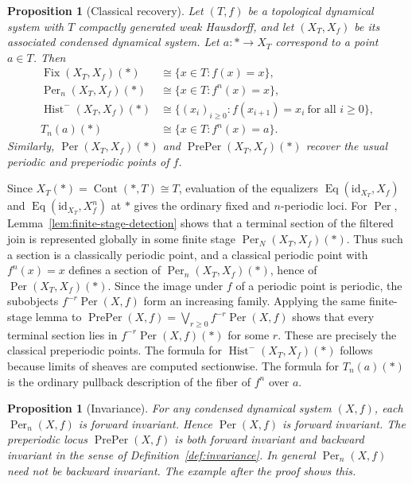 \documentclass[10pt]{amsart}
\makeatletter
\newcommand{\Eq}{\operatorname{Eq}}
\newcommand{\Cont}{\operatorname{Cont}}
\newcommand{\Fix}{\operatorname{Fix}}
\newcommand{\Per}{\operatorname{Per}}
\newcommand{\PrePer}{\operatorname{PrePer}}
\newcommand{\Hist}{\operatorname{Hist}}
\theoremstyle{plain}
\newtheorem{proposition}[theorem]{Proposition}
\theoremstyle{definition}
\renewenvironment{proof}[1][\proofname]{\par
  \pushQED{\qed}%
  \normalfont \topsep6\p@\@plus6\p@\relax
  \trivlist
  \item[\hskip\labelsep\itshape #1\@addpunct{:}]\ignorespaces
}{%
  \popQED\endtrivlist\@endpefalse
}
\makeatother
\begin{document}
\begin{proposition}[Classical recovery]
\label{prop:classical-recovery}
Let $(T,f)$ be a topological dynamical system with $T$ compactly generated weak
Hausdorff, and let $(X_T,X_f)$ be its associated condensed dynamical system.
Let $a:*\to X_T$ correspond to a point $a\in T$.
Then
\begin{align*}
  \Fix(X_T,X_f)(*)
  &\cong
  \{x\in T:f(x)=x\},
\\
  \Per_n(X_T,X_f)(*)
  &\cong
  \{x\in T:f^n(x)=x\},
\\
  \Hist^{-}(X_T,X_f)(*)
  &\cong
  \{(x_i)_{i\ge0}:f(x_{i+1})=x_i\ \text{for all }i\ge0\},
\\
  T_n(a)(*)
  &\cong
  \{x\in T:f^n(x)=a\}.
\end{align*}
Similarly, $\Per(X_T,X_f)(*)$ and $\PrePer(X_T,X_f)(*)$ recover the usual
periodic and preperiodic points of $f$.
\end{proposition}

\begin{proof}
Since $X_T(*)=\Cont(*,T)\cong T$, evaluation of the equalizers
$\Eq(\mathrm{id}_{X_T},X_f)$ and $\Eq(\mathrm{id}_{X_T},X_f^n)$ at $*$ gives
the ordinary fixed and $n$-periodic loci. For $\Per$, Lemma~\ref{lem:finite-stage-detection}
shows that a terminal section of the filtered join is represented globally in
some finite stage $\Per_N(X_T,X_f)(*)$. Thus such a section is a classically
periodic point, and a classical periodic point with $f^n(x)=x$ defines a section
of $\Per_n(X_T,X_f)(*)$, hence of $\Per(X_T,X_f)(*)$. Since the image under $f$
of a periodic point is periodic, the subobjects
$f^{-r}\Per(X,f)$ form an increasing family. Applying the same finite-stage
lemma to
$\PrePer(X,f)=\bigvee_{r\ge0}f^{-r}\Per(X,f)$ shows that every terminal section
lies in $f^{-r}\Per(X,f)(*)$ for some $r$. These are precisely the classical
preperiodic points.
The formula for $\Hist^{-}(X_T,X_f)(*)$ follows because limits of sheaves are
computed sectionwise. The formula for $T_n(a)(*)$ is the ordinary pullback
description of the fiber of $f^n$ over $a$.
\end{proof}

\begin{proposition}[Invariance]
\label{prop:invariance}
For any condensed dynamical system $(X,f)$, each $\Per_n(X,f)$ is forward
invariant. Hence $\Per(X,f)$ is forward invariant. The preperiodic locus
$\PrePer(X,f)$ is both forward invariant and backward invariant in the sense of
Definition~\ref{def:invariance}. In general $\Per_n(X,f)$ need not be backward
invariant. The example after the proof shows this.
\end{proposition}
\end{document}
